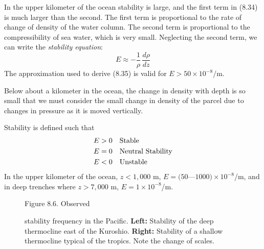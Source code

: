 In the upper kilometer of the ocean stability is large, and the first
term in (8.34) is much larger than the second. The first term is
proportional to the rate of change of density of the water column. The
second term is proportional to the compressibility of sea water, which
is very small. Neglecting the second term, we can write the
\textit{stability equation}:
\begin{equation}
\boxed{E \approx -\frac{1}{\rho}\,\frac{d{\rho}}{d{z}} }
\end{equation}
The approximation used to derive (8.35) is valid for $E > 50 \times
10^{-8}$/m.

Below about a kilometer in the ocean, the change in density with depth
is so small that we must consider the small change in density of the
parcel due to changes in pressure as it is moved vertically.

Stability is defined such that
\begin{align}
E>0 & \quad \text{Stable} \notag \\
E=0 & \quad \text{Neutral Stability} \notag \\
E<0 & \quad \text{Unstable} \notag
\end{align}
In the upper kilometer of the ocean, $z < 1,000$ m,
$E = (50$---$1000)\times 10^{-8}$/m, and in deep trenches where $z > 7,000$ m,
$E = 1 \times 10^{-8}$/m.

\begin{figure}[t!]
\footnotesize
Figure 8.6. Observed \rule{0pt}{3ex} stability
frequency in the Pacific.
\textbf{Left:} Stability of the deep
thermocline east of the
Kuroshio.  \textbf{Right:} Stability of a
shallow thermocline typical of the tropics. Note the change of scales.
\label{fig:stabilityfreq}
\vspace{-3ex}
\end{figure}

